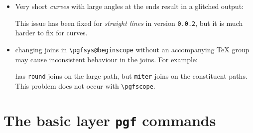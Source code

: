 \documentclass[12pt,a4paper]{article}
\theoremstyle{definition}
\begin{document}
\begin{itemize}
  \item Very short \emph{curves} with large angles at the ends result in a glitched output:
\begin{tkzexample}[latex=3.5cm]
\end{tkzexample}
  This issue has been fixed for \emph{straight lines} in version \texttt{0.0.2}, but it is much harder to fix for curves.
  \item changing joins in \verb|\pgfsys@beginscope| without an accompanying \TeX{} group may cause inconsistent behaviour in the joins. For example:
\begin{tkzexample}[latex=2cm]
\makeatletter
{}
\makeatother
\end{tkzexample}
  has \texttt{round} joins on the large path, but \texttt{miter} joins on the constituent paths. This problem does not occur with \verb|\pgfscope|.
\end{itemize}


\section{The basic layer \texttt{pgf} commands}
\end{document}
